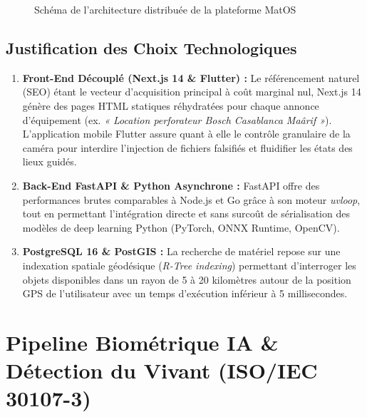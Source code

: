 \documentclass[11pt,a4paper]{report}
\begin{document}
\begin{figure}[h!]
\caption{Schéma de l'architecture distribuée de la plateforme MatOS}
\end{figure}

\section{Justification des Choix Technologiques}
\begin{enumerate}[leftmargin=*]
    \item \textbf{Front-End Découplé (Next.js 14 \& Flutter) :} Le référencement naturel (SEO) étant le vecteur d'acquisition principal à coût marginal nul, Next.js 14 génère des pages HTML statiques réhydratées pour chaque annonce d'équipement (ex. \textit{« Location perforateur Bosch Casablanca Maârif »}). L'application mobile Flutter assure quant à elle le contrôle granulaire de la caméra pour interdire l'injection de fichiers falsifiés et fluidifier les états des lieux guidés.
    \item \textbf{Back-End FastAPI \& Python Asynchrone :} FastAPI offre des performances brutes comparables à Node.js et Go grâce à son moteur \textit{uvloop}, tout en permettant l'intégration directe et sans surcoût de sérialisation des modèles de deep learning Python (PyTorch, ONNX Runtime, OpenCV).
    \item \textbf{PostgreSQL 16 \& PostGIS :} La recherche de matériel repose sur une indexation spatiale géodésique (\textit{R-Tree indexing}) permettant d'interroger les objets disponibles dans un rayon de 5 à 20 kilomètres autour de la position GPS de l'utilisateur avec un temps d'exécution inférieur à 5 millisecondes.
\end{enumerate}

\chapter{Pipeline Biométrique IA \& Détection du Vivant (ISO/IEC 30107-3)}
\end{document}
